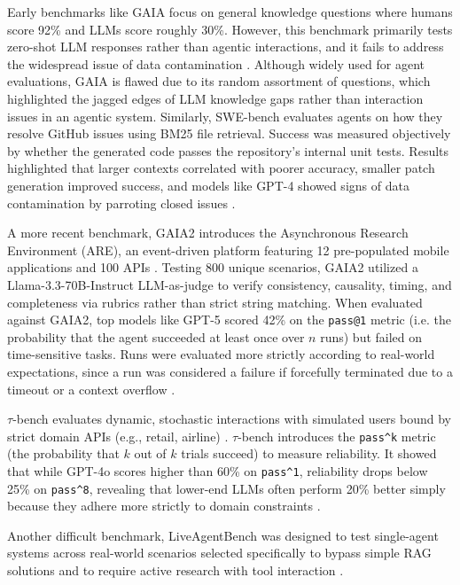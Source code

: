 \documentclass[conference]{IEEEtran}
\begin{document}
Early benchmarks like GAIA 
focus on general knowledge questions where humans score 92\% and LLMs score roughly 30\%. 
However, this benchmark primarily tests zero-shot LLM responses
rather than agentic interactions, and it fails to address the widespread issue 
of data contamination \cite{mialon_gaia_2023}.
Although widely used for agent evaluations, GAIA is flawed due to its random assortment of questions,
which highlighted the jagged edges of LLM knowledge gaps rather than interaction issues in an agentic system.
Similarly, SWE-bench evaluates agents on how they resolve GitHub issues using BM25 file retrieval. 
Success was measured objectively by whether the generated code passes the repository's internal unit tests. 
Results highlighted that larger contexts correlated with poorer accuracy, 
smaller patch generation improved success, and models like GPT-4 showed signs of data 
contamination by parroting closed issues \cite{jimenez_swe-bench_2024}.

A more recent benchmark, GAIA2 introduces the Asynchronous Research Environment (ARE), 
an event-driven platform featuring 12 pre-populated mobile applications and 100 APIs \cite{froger_gaia2_2026}. 
Testing 800 unique scenarios, GAIA2 utilized a Llama-3.3-70B-Instruct LLM-as-judge
to verify consistency, causality, timing, and completeness via rubrics rather than strict string matching. 
When evaluated against GAIA2, top models like GPT-5 scored 42\% on the
\verb+pass@1+ metric (i.e. the probability that the agent succeeded at least once over $n$ runs)
but failed on time-sensitive tasks.
Runs were evaluated more strictly according to real-world expectations, since a run was
considered a failure if forcefully terminated due to a timeout 
or a context overflow \cite{froger_gaia2_2026}.

$\tau$-bench evaluates dynamic, 
stochastic interactions with simulated users bound by strict domain APIs 
(e.g., retail, airline) \cite{yao_tau-bench_2024}. 
$\tau$-bench introduces the \verb+pass^k+ metric (the probability that $k$ out of $k$ trials succeed) 
to measure reliability. 
It showed that while GPT-4o scores higher than 60\% on \verb+pass^1+, 
reliability drops below 25\% on \verb+pass^8+, revealing that lower-end LLMs often perform 20\% 
better simply because they adhere more strictly to domain constraints \cite{yao_tau-bench_2024}. 

Another difficult benchmark, LiveAgentBench was designed to test single-agent systems
across real-world scenarios selected
specifically to bypass simple RAG solutions and to require active research with tool interaction
\cite{li_liveagentbench_2026}. 
\end{document}
